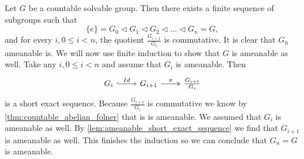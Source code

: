 Let $G$ be a countable solvable group. Then there exists a finite sequence of subgroups such that 
$$\{e\} = G_0 \triangleleft G_1 \triangleleft G_2 \triangleleft \dots \triangleleft G_n = G,$$ and for every $i, 0\le i<n$, the quotient $\frac{G_{i+1}}{G_i}$ is commutative. 
It is clear that $G_0$ ameanable is. We will now use finite induction to show that $G$ is ameanable as well. 
Take any $i, 0\le i<n$ and assume that $G_i$ is ameanable. Then 
\[\begin{tikzcd}
    G_i \arrow[r, "Id", hook] & G_{i+1} \arrow[r, "\pi", two heads] & \frac{G_{i+1}}{G_i}
    \end{tikzcd}\]
is a short exact sequence. Because $\frac{G_{i+1}}{G_i}$ is commutative we know by \cref{thm:countable_abelian_folner} that is is ameanable. We assumed that $G_i$ is ameanable as well. By \cref{lem:ameanable_short_exact_sequence} we find that $G_{i+1}$ is ameanable as well. This finishes the induction so we can conclude that $G_n = G$ is ameanable.
